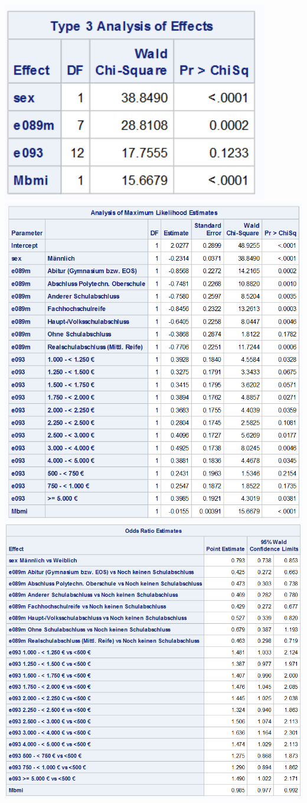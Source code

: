 \documentclass[
  10pt,
]{article}
\begin{document}
\includegraphics[width=4.58in]{./Yimeng_Plots/M7_2}
\includegraphics[width=10.61in]{./Yimeng_Plots/M7_4}
\includegraphics[width=12.18in]{./Yimeng_Plots/M7_5}
\end{document}
